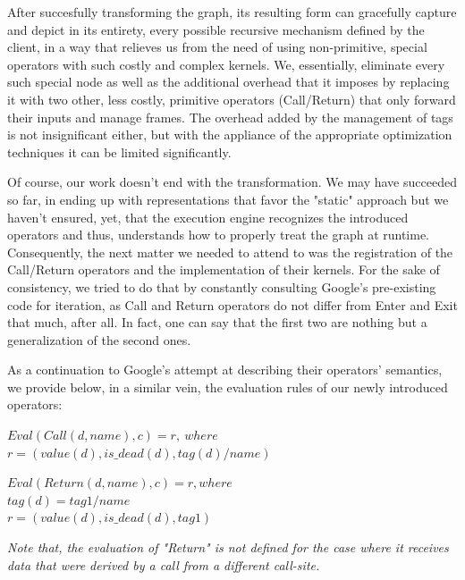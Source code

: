 \documentclass[ack,preface]{dithesis}
\begin{document}
After succesfully transforming the graph, its resulting form can gracefully capture and depict in its entirety, every possible recursive mechanism defined by the client, in a way that relieves us from the need of using non-primitive, special operators with such costly and complex kernels. We, essentially,  eliminate every such special node as well as the additional overhead that it imposes by replacing it with two other, less costly, primitive operators (Call/Return) that only forward their inputs and manage frames.  The overhead added by the management of tags is not insignificant either, but with the appliance of the appropriate optimization techniques it can be limited significantly.

Of course, our work doesn't end with the transformation. We may have succeeded so far, in ending up with representations that favor the "static" approach but we haven't ensured, yet, that the  execution engine recognizes the introduced operators and thus, understands how to properly treat the graph at runtime. Consequently, the next matter we needed to attend to was the registration of the Call/Return operators and the implementation of their kernels.  For the sake of consistency, we tried to do that by constantly consulting Google's pre-existing code for iteration, as Call and Return operators do not differ from Enter and Exit that much, after all. In fact, one can say that the first two are nothing but a generalization of the second ones. 


As a continuation to Google's attempt at describing their operators' semantics, we provide below, in a similar vein, the evaluation rules of our newly introduced operators:

\begin{flushleft}
$Eval(Call(d, name), c) = r,\  where$ \\
\setlength{\parindent}{5ex} $r = (value(d), is\_dead(d), tag(d)/name)$
\end{flushleft}

\begin{flushleft}
$Eval(Return(d, name), c) = r, where \ $ \\
\setlength{\parindent}{5ex} $tag(d) = tag1/name$\\
$ r = (value(d), is\_dead(d), tag1)$
\end{flushleft}

\textit{Note that, the evaluation of "Return" is not defined for the case where it receives data that were derived by a call from a different call-site.}\\
\end{document}
